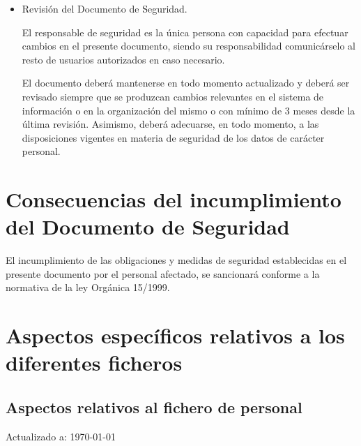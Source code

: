 \documentclass[a4paper,11pt,bibtotoc,noliststotoc]{scrbook}
\begin{document}
\begin{itemize}
\item Revisión del Documento de Seguridad.

El responsable de seguridad es la única persona con capacidad para efectuar cambios en el presente documento, siendo su responsabilidad comunicárselo al resto de usuarios autorizados en caso necesario.

El documento deberá mantenerse en todo momento actualizado y deberá ser revisado siempre que se produzcan cambios relevantes en el sistema de información o en la organización del mismo o con mínimo de 3 meses desde la última revisión. Asimismo, deberá adecuarse, en todo momento, a las disposiciones vigentes en materia de seguridad de los datos de carácter personal.


\end{itemize}


\chapter{Consecuencias del incumplimiento del Documento de Seguridad}

El incumplimiento de las obligaciones y medidas de seguridad establecidas en el presente documento por el personal afectado, se sancionará conforme a la normativa de la ley Orgánica 15/1999.






\appendix
\chapter{Aspectos específicos relativos a los diferentes ficheros}

\section{Aspectos relativos al fichero de personal}

Actualizado a: \today
\end{document}
